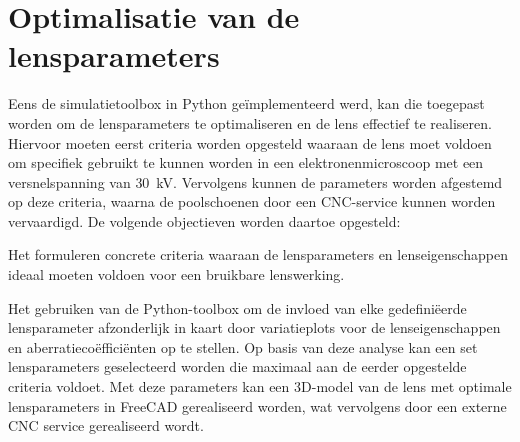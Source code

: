 \documentclass[we,twoside,openright,a4paper,11pt]{uantwerpenbamathesis}
\begin{document}
\chapter{Optimalisatie van de lensparameters}\label{ch:optimalisatie}
Eens de simulatietoolbox in Python geïmplementeerd werd, kan die toegepast worden om de lensparameters te optimaliseren en de lens effectief te realiseren. Hiervoor moeten eerst criteria worden opgesteld waaraan de lens moet voldoen om specifiek gebruikt te kunnen worden in een elektronenmicroscoop met een versnelspanning van $30$~kV. Vervolgens kunnen de parameters worden afgestemd op deze criteria, waarna de poolschoenen door een CNC-service kunnen worden vervaardigd. De volgende objectieven worden daartoe opgesteld:

\begin{tcolorbox}[colback=red!10!white, colframe=red!40!white, sharp corners,title=Objectief 5]
    Het formuleren concrete criteria waaraan de lensparameters en lenseigenschappen ideaal moeten voldoen voor een bruikbare lenswerking.
\end{tcolorbox}

\begin{tcolorbox}[colback=red!10!white, colframe=red!40!white, sharp corners, title=Objectief 6]
    Het gebruiken van de Python-toolbox om de invloed van elke gedefiniëerde lensparameter afzonderlijk in kaart door variatieplots voor de lenseigenschappen en aberratiecoëfficiënten op te stellen. Op basis van deze analyse kan een set lensparameters geselecteerd worden die maximaal aan de eerder opgestelde criteria voldoet. Met deze parameters kan een 3D-model van de lens met optimale lensparameters in FreeCAD gerealiseerd worden, wat vervolgens door een externe CNC service gerealiseerd wordt.
\end{tcolorbox}
\end{document}
